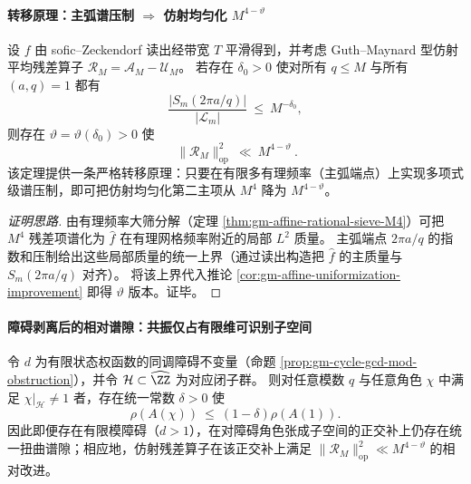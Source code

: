 \paragraph{转移原理：主弧谱压制 \texorpdfstring{$\Rightarrow$}{=>} 仿射均匀化 \texorpdfstring{$M^{4-\vartheta}$}{M4-vtheta}}
\begin{theorem}[模主弧谱压制 \texorpdfstring{$\Rightarrow$}{=>} 仿射均匀化幂次节省：从 Pisano 频谱到 \texorpdfstring{$M^{4-\vartheta}$}{M4-vtheta}]\label{thm:gm-mod-gap-to-affine-saving}
设 \(f\) 由 sofic--Zeckendorf 读出经带宽 \(T\) 平滑得到，并考虑 Guth--Maynard 型仿射平均残差算子 \(\mathcal{R}_M=\mathcal{A}_M-\mathcal{U}_M\)。
若存在 \(\delta_0>0\) 使对所有 \(q\le M\) 与所有 \((a,q)=1\) 都有
\[
\frac{|S_m(2\pi a/q)|}{|\mathcal{L}_m|}\ \le\ M^{-\delta_0},
\]
则存在 \(\vartheta=\vartheta(\delta_0)>0\) 使
\[
\boxed{\ \|\mathcal{R}_M\|_{\mathrm{op}}^2\ \ll\ M^{4-\vartheta}\ }.
\]
该定理提供一条严格转移原理：只要在有限多有理频率（主弧端点）上实现多项式级谱压制，即可把仿射均匀化第二主项从 \(M^4\) 降为 \(M^{4-\vartheta}\)。
\end{theorem}

\begin{proof}[证明思路]
由有理频率大筛分解（定理 \ref{thm:gm-affine-rational-sieve-M4}）可把 \(M^4\) 残差项谱化为 \(\widehat f\) 在有理网格频率附近的局部 \(L^2\) 质量。
主弧端点 \(2\pi a/q\) 的指数和压制给出这些局部质量的统一上界（通过读出构造把 \(\widehat f\) 的主质量与 \(S_m(2\pi a/q)\) 对齐）。
将该上界代入推论 \ref{cor:gm-affine-uniformization-improvement} 即得 \(\vartheta\) 版本。证毕。
\end{proof}

\paragraph{障碍剥离后的相对谱隙：共振仅占有限维可识别子空间}
\begin{theorem}\label{thm:gm-relative-gap-after-obstruction}
令 \(d\) 为有限状态权函数的同调障碍不变量（命题 \ref{prop:gm-cycle-gcd-mod-obstruction}），并令 \(\mathcal{H}\subset\widehat{\ZZ}\) 为对应闭子群。
则对任意模数 \(q\) 与任意角色 \(\chi\) 中满足 \(\chi|_{\mathcal{H}}\neq 1\) 者，存在统一常数 \(\delta>0\) 使
\[
\rho(A(\chi))\ \le\ (1-\delta)\rho(A(1)).
\]
因此即便存在有限模障碍（\(d>1\)），在对障碍角色张成子空间的正交补上仍存在统一扭曲谱隙；相应地，仿射残差算子在该正交补上满足 \(\|\mathcal{R}_M\|_{\mathrm{op}}^2\ll M^{4-\vartheta}\) 的相对改进。
\end{theorem}

